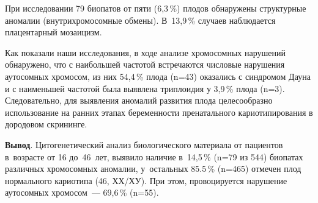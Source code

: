 

При исследовании 79 биопатов от пяти (6,3\,\%) плодов обнаружены структурные аномалии (внутрихромосомные обмены). В~13,9\,\% случаев наблюдается плацентарный мозаицизм.

Как показали наши исследования, в ходе анализе хромосомных нарушений обнаружено, что с наибольшей частотой встречаются числовые нарушения аутосомных хромосом, из них 54,4\,\% плода (n=43) оказались с синдромом Дауна и с наименьшей частотой была выявлена триплоидия у 3,9\,\% плода (n=3). Следовательно, для выявления аномалий развития плода целесообразно использование на ранних этапах беременности пренатального кариотипирования в дородовом скрининге.

\textbf{Вывод}. Цитогенетический анализ биологического материала от пациентов в~возрасте от 16 до~46~лет, выявило наличие в~14,5\,\% (n=79 из 544) биопатах различных хромосомных аномалии, у~остальных 85.5\,\% (n=465) отмечен плод нормального кариотипа (46, ХХ/ХУ). При этом, провоцируется нарушение аутосомных хромосом~--- 69,6\,\% (n=55).

